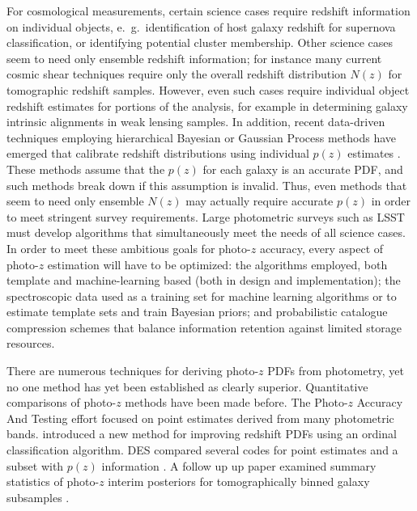 For cosmological measurements, certain science cases require redshift information on individual objects, e.~g.~identification of host galaxy redshift for supernova classification, or identifying potential cluster membership.
Other science cases seem to need only ensemble redshift information; for instance many current cosmic shear techniques require only the overall redshift distribution $N(z)$ for tomographic redshift samples.  However,  even such cases require individual object redshift estimates for portions of the analysis, for example in determining galaxy intrinsic alignments in weak lensing samples.  In addition, recent data-driven techniques employing hierarchical Bayesian or Gaussian Process methods have emerged that calibrate redshift distributions using individual $p(z)$ estimates \citep[e.~g.~][]{Sanchez:2018}.  These methods assume that the $p(z)$ for each galaxy is an accurate PDF, and such methods break down if this assumption is invalid.  Thus, even methods that seem to need only ensemble $N(z)$ may actually require accurate $p(z)$ in order to meet stringent survey requirements.
Large photometric surveys such as LSST must develop algorithms that simultaneously meet the needs of all science cases.
In order to meet these ambitious goals for photo-$z$ accuracy, every aspect of photo-$z$ estimation will have to be optimized: the algorithms employed, both template and machine-learning based (both in design and implementation); the spectroscopic data used as a training set for machine learning algorithms or to estimate template sets and train Bayesian priors; and probabilistic catalogue compression schemes that balance information retention against limited storage resources.

There are numerous techniques for deriving photo-$z$ PDFs from photometry, yet no one method has yet been established as clearly superior.
Quantitative comparisons of photo-$z$ methods have been made before.
The Photo-$z$ Accuracy And Testing \citep[PHAT,][]{Hildebrandt:10} effort focused on point estimates derived from many photometric bands.  \citet{Rau:2015} introduced a new method for improving redshift PDFs using an ordinal classification algorithm.
DES compared several codes for point estimates and a subset with $p(z)$ information \citep{Sanchez:14}.  A follow up up paper examined summary statistics of photo-$z$ interim posteriors for tomographically binned galaxy subsamples \citep{Bonnett:16}.  



